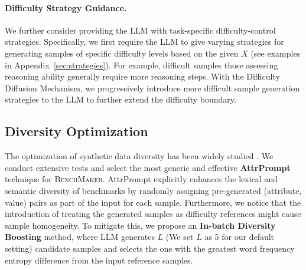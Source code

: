 \paragraph{Difficulty Strategy Guidance.}
We further consider providing the LLM with task-specific difficulty-control strategies. Specifically, we first require the LLM to give varying strategies for generating samples of specific difficulty levels based on the given $X$ (see examples in Appendix~\ref{sec:strategies}). For example, difficult samples those assessing reasoning ability generally require more reasoning steps. With the Difficulty Diffusion Mechanism, we progressively introduce more difficult sample generation strategies to the LLM to further extend the difficulty boundary.


\subsection{Diversity Optimization}
\label{sec:div_opt}
The optimization of synthetic data diversity has been widely studied \citep{datasurvey1}. We conduct extensive tests and select the most generic and effective \textbf{AttrPrompt} \citep{attr} technique for \textsc{BenchMaker}. 
AttrPrompt explicitly enhances the lexical and semantic diversity of benchmarks by randomly assigning pre-generated (attribute, value) pairs as part of the input for each sample.
Furthermore, we notice that the introduction of treating the generated samples as difficulty references might cause sample homogeneity. To mitigate this, we propose an \textbf{In-batch Diversity Boosting} method, where LLM generates $L$ (We set $L$ as 5 for our default setting) candidate samples and selects the one with the greatest word frequency entropy difference from the input reference samples.

